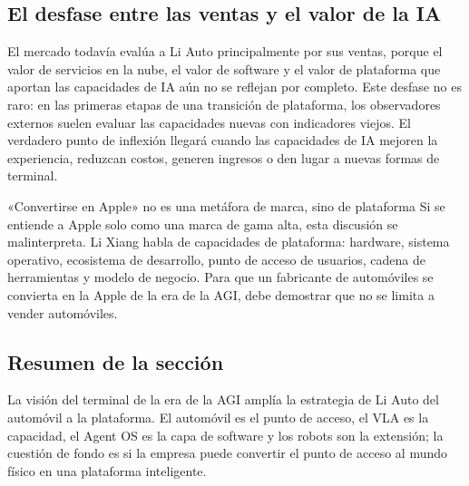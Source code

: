 \subsection{El desfase entre las ventas y el valor de la IA}

El mercado todavía evalúa a Li Auto principalmente por sus ventas, porque el valor de servicios en la nube, el valor de software y el valor de plataforma que aportan las capacidades de IA aún no se reflejan por completo. Este desfase no es raro: en las primeras etapas de una transición de plataforma, los observadores externos suelen evaluar las capacidades nuevas con indicadores viejos. El verdadero punto de inflexión llegará cuando las capacidades de IA mejoren la experiencia, reduzcan costos, generen ingresos o den lugar a nuevas formas de terminal.

\begin{warningbox}{«Convertirse en Apple» no es una metáfora de marca, sino de plataforma}
Si se entiende a Apple solo como una marca de gama alta, esta discusión se malinterpreta. Li Xiang habla de capacidades de plataforma: hardware, sistema operativo, ecosistema de desarrollo, punto de acceso de usuarios, cadena de herramientas y modelo de negocio. Para que un fabricante de automóviles se convierta en la Apple de la era de la AGI, debe demostrar que no se limita a vender automóviles.
\end{warningbox}

\subsection{Resumen de la sección}

La visión del terminal de la era de la AGI amplía la estrategia de Li Auto del automóvil a la plataforma. El automóvil es el punto de acceso, el VLA es la capacidad, el Agent OS es la capa de software y los robots son la extensión; la cuestión de fondo es si la empresa puede convertir el punto de acceso al mundo físico en una plataforma inteligente.
